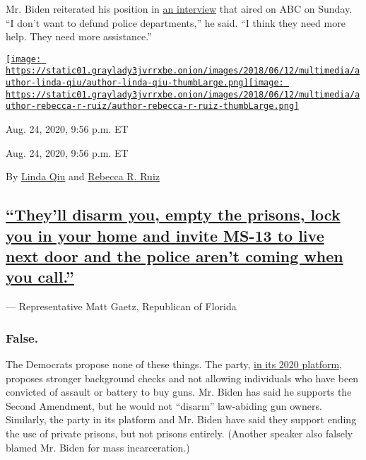 Mr. Biden reiterated his position in
\href{https://abcnews.go.com/Politics/transcript-joe-biden-kamala-harris-joint-interview-abcs/story?id=72542387}{an
interview} that aired on ABC on Sunday. ``I don't want to defund police
departments,'' he said. ``I think they need more help. They need more
assistance.''

\href{https://www.nytimes3xbfgragh.onion/by/linda-qiu}{\texttt{[image: https://static01.graylady3jvrrxbe.onion/images/2018/06/12/multimedia/author-linda-qiu/author-linda-qiu-thumbLarge.png]}}\href{https://www.nytimes3xbfgragh.onion/by/rebecca-r-ruiz}{\texttt{[image: https://static01.graylady3jvrrxbe.onion/images/2018/06/12/multimedia/author-rebecca-r-ruiz/author-rebecca-r-ruiz-thumbLarge.png]}}

Aug. 24, 2020, 9:56 p.m. ET

Aug. 24, 2020, 9:56 p.m. ET

By \href{https://www.nytimes3xbfgragh.onion/by/linda-qiu}{Linda Qiu} and
\href{https://www.nytimes3xbfgragh.onion/by/rebecca-r-ruiz}{Rebecca R.
Ruiz}

\hypertarget{theyll-disarm-you-empty-the-prisons-lock-you-in-your-home-and-invite-ms-13-to-live-next-door-and-the-police-arent-coming-when-you-call}{%
\subsection{\texorpdfstring{\protect\hyperlink{theyll-disarm-you-empty-the-prisons-lock-you-in-your-home-and-invite-ms-13-to-live-next-door-and-the-police-arent-coming-when-yo}{``They'll
disarm you, empty the prisons, lock you in your home and invite MS-13 to
live next door and the police aren't coming when you
call.''}}{``They'll disarm you, empty the prisons, lock you in your home and invite MS-13 to live next door and the police aren't coming when you call.''}}\label{theyll-disarm-you-empty-the-prisons-lock-you-in-your-home-and-invite-ms-13-to-live-next-door-and-the-police-arent-coming-when-you-call}}

--- Representative Matt Gaetz, Republican of Florida

\hypertarget{false-2}{%
\subsubsection{False.}\label{false-2}}

The Democrats propose none of these things. The party,
\href{https://slack-redir.net/link?url=https\%3A\%2F\%2Fwww.demconvention.com\%2Fwp-content\%2Fuploads\%2F2020\%2F08\%2F2020-07-31-Democratic-Party-Platform-For-Distribution.pdf}{in
its 2020 platform}, proposes stronger background checks and not allowing
individuals who have been convicted of assault or battery to buy guns.
Mr. Biden has said he supports the Second Amendment, but he would not
``disarm'' law-abiding gun owners. Similarly, the party in its platform
and Mr. Biden have said they support ending the use of private prisons,
but not prisons entirely. (Another speaker also falsely blamed Mr. Biden
for mass incarceration.)


